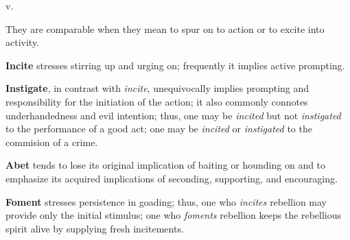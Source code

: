 \begin{description}[style=unboxed]
 v.
\begin{mynewitemize}
\item They are comparable when they mean to spur on to action or to excite
into activity.
\item \textbf{Incite} stresses stirring up and urging on; frequently it 
implies active prompting.
\item \textbf{Instigate}, in contrast with \textit{incite}, unequivocally
implies prompting and responsibility for the initiation of the action; it
also commonly connotes underhandedness and evil intention; thus, one may be 
\textit{incited} but not \textit{instigated} to the performance of a good 
act; one may be \textit{incited} or \textit{instigated} to the commision
of a crime.
\item \textbf{Abet} tends to lose its original implication of baiting or
hounding on and to emphasize its acquired implications of seconding, supporting,
and encouraging.
\item \textbf{Foment} stresses persistence in goading; thus, one who 
\textit{incites} rebellion may provide only the initial stimulus; one
who \textit{foments} rebellion keeps the rebellious spirit alive by 
supplying fresh incitements.
\end{mynewitemize}


\end{description}
